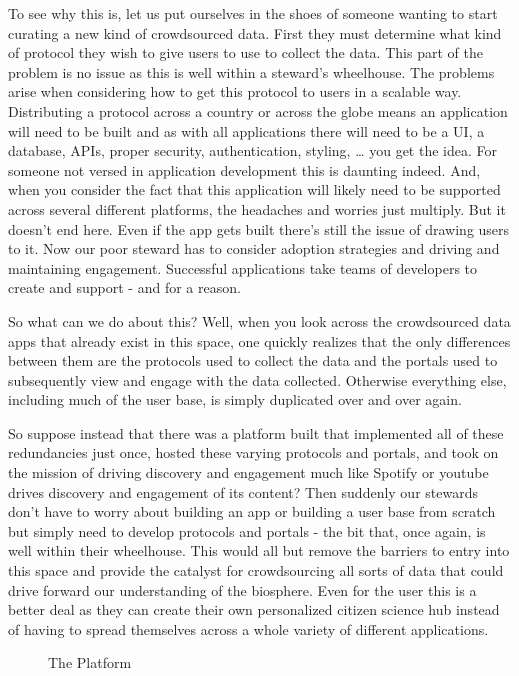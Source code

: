 \documentclass[10pt,a5paper]{book}
\begin{document}
To see why this is, let us put ourselves in the shoes of someone wanting to start curating a new kind of crowdsourced data. First they must determine what kind of protocol they wish to give users to use to collect the data. This part of the problem is no issue as this is well within a steward’s wheelhouse. The problems arise when considering how to get this protocol to users in a scalable way. Distributing a protocol across a country or across the globe means an application will need to be built and as with all applications there will need to be a UI, a database, APIs, proper security, authentication, styling, … you get the idea. For someone not versed in application development this is daunting indeed. And, when you consider the fact that this application will likely need to be supported across several different platforms, the headaches and worries just multiply. But it doesn’t end here. Even if the app gets built there’s still the issue of drawing users to it. Now our poor steward has to consider adoption strategies and driving and maintaining engagement. Successful applications take teams of developers to create and support - and for a reason. 

So what can we do about this? Well, when you look across the crowdsourced data apps that already exist in this space, one quickly realizes that the only differences between them are the protocols used to collect the data and the portals used to subsequently view and engage with the data collected. Otherwise everything else, including much of the user base, is simply duplicated over and over again.

So suppose instead that there was a platform built that implemented all of these redundancies just once, hosted these varying protocols and portals, and took on the mission of driving discovery and engagement much like Spotify or youtube drives discovery and engagement of its content? Then suddenly our stewards don’t have to worry about building an app or building a user base from scratch but simply need to develop protocols and portals - the bit that, once again, is well within their wheelhouse. This would all but remove the barriers to entry into this space and provide the catalyst for crowdsourcing all sorts of data that could drive forward our understanding of the biosphere. Even for the user this is a better deal as they can create their own personalized citizen science hub instead of having to spread themselves across a whole variety of different applications. 


\begin{figure}[!htb]
\caption{\label{fig:my-label} The Platform}
\end{figure}
\end{document}
